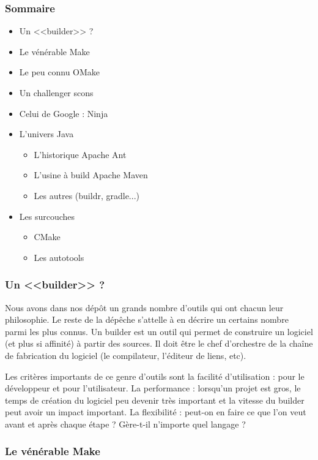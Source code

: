 \documentclass[11pt,twoside,a4paper]{article}
\begin{document}
\subsubsection{Sommaire}
\begin{itemize}
	\item Un <<builder>> ?
	\item Le v{\'e}n{\'e}rable Make
	\item Le peu connu OMake
	\item Un challenger scons
	\item Celui de Google : Ninja
	\item L'univers Java
	\begin{itemize}
		\item L'historique Apache Ant
		\item L'usine {\`a} build Apache Maven
		\item Les autres (buildr, gradle...)
	\end{itemize}
	\item Les surcouches
	\begin{itemize}
		\item CMake
		\item Les autotools
	\end{itemize}
\end{itemize}

\subsubsection{Un <<builder>> ?}

Nous avons dans nos d{\'e}p{\^o}t un grands nombre d'outils qui ont chacun leur philosophie. Le reste de la d{\'e}p{\^e}che s'attelle {\`a} en d{\'e}crire un certains nombre parmi les plus connus.
Un builder est un outil qui permet de construire un logiciel (et plus si affinit{\'e}) {\`a} partir des sources. Il doit {\^e}tre le chef d'orchestre de la cha{\^i}ne de fabrication du logiciel (le compilateur, l'{\'e}diteur de liens, etc).

Les crit{\`e}res importants de ce genre d'outils sont la facilit{\'e} d'utilisation : pour le d{\'e}veloppeur et pour l'utilisateur. La performance : lorsqu'un projet est gros, le temps de cr{\'e}ation du logiciel peu devenir tr{\`e}s important et la vitesse du builder peut avoir un impact important. La flexibilit{\'e} : peut-on en faire ce que l'on veut avant et apr{\`e}s chaque {\'e}tape ? G{\`e}re-t-il n'importe quel langage ?

\subsubsection{Le v{\'e}n{\'e}rable Make}
\end{document}

